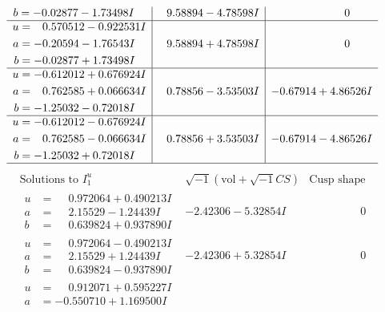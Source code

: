 \documentclass[1p]{elsarticle_modified}
\theoremstyle{definition}
\newcommand{\I}{\sqrt{-1}}
\begin{document}
$$\begin{array}{c|c|c}
\begin{aligned}
b &= -0.02877 - 1.73498 I\end{aligned}
 & \phantom{-}9.58894 - 4.78598 I & \phantom{-0.000000 } 0 \\ \hline\begin{aligned}
u &= \phantom{-}0.570512 - 0.922531 I \\
a &= -0.20594 - 1.76543 I \\
b &= -0.02877 + 1.73498 I\end{aligned}
 & \phantom{-}9.58894 + 4.78598 I & \phantom{-0.000000 } 0 \\ \hline\begin{aligned}
u &= -0.612012 + 0.676924 I \\
a &= \phantom{-}0.762585 + 0.066634 I \\
b &= -1.25032 - 0.72018 I\end{aligned}
 & \phantom{-}0.78856 - 3.53503 I & -0.67914 + 4.86526 I \\ \hline\begin{aligned}
u &= -0.612012 - 0.676924 I \\
a &= \phantom{-}0.762585 - 0.066634 I \\
b &= -1.25032 + 0.72018 I\end{aligned}
 & \phantom{-}0.78856 + 3.53503 I & -0.67914 - 4.86526 I\\
 \hline 
 \end{array}$$\newpage$$\begin{array}{c|c|c}  
\text{Solutions to }I^u_{1}& \I (\text{vol} + \sqrt{-1}CS) & \text{Cusp shape}\\
 \hline 
\begin{aligned}
u &= \phantom{-}0.972064 + 0.490213 I \\
a &= \phantom{-}2.15529 - 1.24439 I \\
b &= \phantom{-}0.639824 + 0.937890 I\end{aligned}
 & -2.42306 - 5.32854 I & \phantom{-0.000000 } 0 \\ \hline\begin{aligned}
u &= \phantom{-}0.972064 - 0.490213 I \\
a &= \phantom{-}2.15529 + 1.24439 I \\
b &= \phantom{-}0.639824 - 0.937890 I\end{aligned}
 & -2.42306 + 5.32854 I & \phantom{-0.000000 } 0 \\ \hline\begin{aligned}
u &= \phantom{-}0.912071 + 0.595227 I \\
a &= -0.550710 + 1.169500 I \\

\end{aligned}
\end{array}$$
\end{document}
